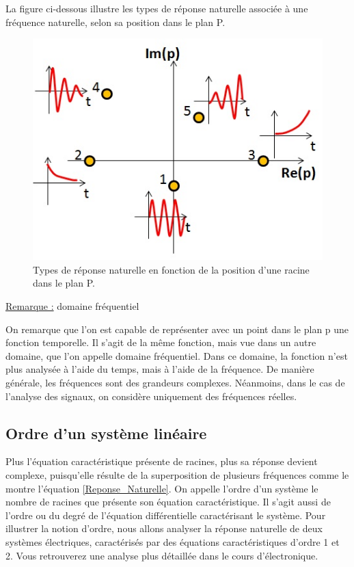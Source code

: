 \documentclass[]{book}
\begin{document}
{	La figure ci-dessous illustre les types de réponse naturelle associée à une fréquence naturelle, selon sa position dans le plan P.
	\begin{figure}[h!]
		\centering
		\includegraphics[scale=0.5]{images/reponse_vs_p.jpg} 
		\caption{Types de réponse naturelle en fonction de la position d'une racine dans le plan P.}	
		\label{Fig:reponse_vs_p}
	\end{figure}
	
	\underline{Remarque :} domaine fréquentiel
	
	On remarque que l'on est capable de représenter avec un point dans le
	plan p une fonction temporelle. Il s'agit de la même fonction, mais vue
	dans un autre domaine, que l'on appelle domaine fréquentiel. Dans ce domaine, la fonction n'est plus analysée à l'aide du temps, mais à l'aide de la fréquence. De manière générale, les fréquences sont des grandeurs complexes. Néanmoins, dans le cas de l'analyse des signaux, on considère uniquement des fréquences réelles.
	
	
	\subsection{Ordre d'un système linéaire}
	
	Plus l'équation caractéristique présente de racines, plus sa réponse
	devient complexe, puisqu'elle résulte de la superposition de plusieurs
	fréquences  comme le montre l'équation \ref{Reponse_Naturelle}. On appelle l'ordre
	d'un système le nombre de racines que présente son équation
	caractéristique. Il s'agit aussi de l'ordre ou du degré de l'équation
	différentielle caractérisant le système. Pour illustrer la notion
	d'ordre, nous allons analyser la réponse naturelle de deux systèmes
	électriques, caractérisés par des équations caractéristiques d'ordre 1 et 2. Vous retrouverez une analyse plus détaillée dans le cours d'électronique.
	
}
\end{document}
